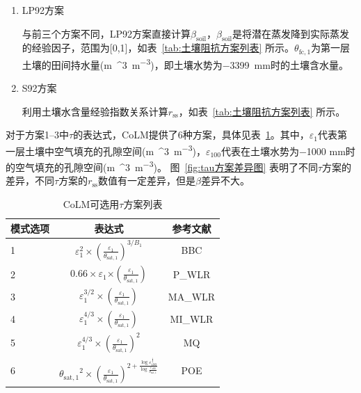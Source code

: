 \begin{enumerate}
  \item
    LP92方案

    与前三个方案不同，LP92方案直接计算\(\beta_{\mathrm{soil}}\)，\(\beta_{\mathrm{soil}}\)是将潜在蒸发降到实际蒸发的经验因子，范围为{[}0,1{]}，如表~\ref{tab:土壤阻抗方案列表} 所示。\(\theta_{\mathrm{fc,1}}\)为第一层土壤的田间持水量(\unit{m{^3}.m^{-3}})，即土壤水势为\qty{-3399}{mm}时的土壤含水量。

  \item
    S92方案

    利用土壤水含量经验指数关系计算\(r_{\mathrm{ss}}\)，如表~\ref{tab:土壤阻抗方案列表} 所示。
%
\end{enumerate}

对于方案1--3中\(\tau\)的表达式，CoLM提供了6种方案，具体见表~\ref{tab:tau方案列表}。其中，\(\varepsilon_{1}\)代表第一层土壤中空气填充的孔隙空间(\unit{m{^3}.m^{-3}})，\(\varepsilon_{100}\)代表在土壤水势为\num{-1000} mm时的空气填充的孔隙空间(\unit{m{^3}.m^{-3}})。
图~\ref{fig:tau方案差异图} 表明了不同\(\tau\)方案的差异，不同\(\tau\)方案的\(r_{\mathrm{ss}}\)数值有一定差异，但是$\beta$差异不大。

{
  \begin{table}[htbp]
    \centering
    \caption{CoLM可选用$\tau$方案列表}
    \label{tab:tau方案列表}
    \begin{tabular}{lcc}
      \toprule
      模式选项 & 表达式 & 参考文献 \\
      \midrule
      1 &
      \(\varepsilon_{1}^{2} \times {(\frac{\varepsilon_{1}}{\theta_{\mathrm{sat,1}}})}^{3/B_{1}}\)
      & \citet{BBC1999} BBC \\
      2 & \(0.66 \times \varepsilon_{1}{\times (\frac{\varepsilon_{1}}{\theta_{\mathrm{sat,1}}})}\)
      & \citet{moldrup2000} P\_WLR \\
      3 & \(\varepsilon_{1}^{3/2} \times (\frac{\varepsilon_{1}}{\theta_{\mathrm{sat,1}}})\)
      & \citet{moldrup2000} MA\_WLR \\
      4 & \(\varepsilon_{1}^{4/3} \times (\frac{\varepsilon_{1}}{\theta_{\mathrm{sat,1}}})\)
      & \citet{moldrup2000} MI\_WLR \\
      5 & \(\varepsilon_{1}^{4/3} \times {(\frac{\varepsilon_{1}}{\theta_{\mathrm{sat,1}}})}^{2}\)
      & \citet{millington_permeability_1961} MQ \\
      6 & \({\theta_{\mathrm{sat,1}}}^{2} \times {(\frac{\varepsilon_{1}}{\theta_{\mathrm{sat,1}}})}^{2 + \frac{\log\varepsilon_{100}^{\frac{1}{4}}}{\log\frac{\varepsilon_{100}}{\theta_{\mathrm{sat,1}}}}}\) & \citet{POE2005} POE \\ \bottomrule
    \end{tabular}
  \end{table}
}

